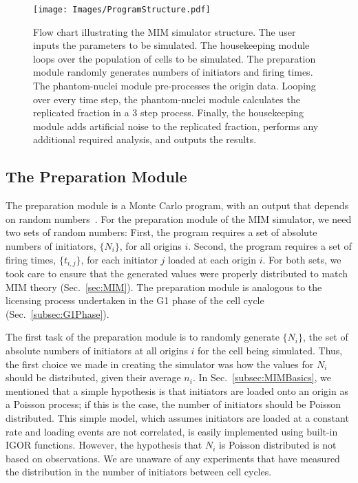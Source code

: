	\begin{figure}[1][tbh]
		\begin{center}
			\texttt{[image: Images/ProgramStructure.pdf]}
		\end{center}
			\caption[MIM Simulator Program Structure]{\label{fig:ProgramStructure} 
				Flow chart illustrating the MIM simulator structure.
				The user inputs the parameters to be simulated.
				The housekeeping module loops over the population of cells to be simulated.
				The preparation module randomly generates numbers of initiators and firing times.
				The phantom-nuclei module pre-processes the origin data.
				Looping over every time step, the phantom-nuclei module calculates the replicated fraction in a 3 step process.
				Finally, the housekeeping module adds artificial noise to the replicated fraction, performs any additional required analysis, and outputs the results.
			}
%
	\end{figure}
	
	
		\subsection{The Preparation Module}
		\label{subsec:PrepModule}
		
		The preparation module is a Monte Carlo program, with an output that depends on random numbers~\cite{CompPhys}.
		For the preparation module of the MIM simulator,  we need two sets of random numbers:
		First, the program requires a set of absolute numbers of initiators, $\{N_i\}$, for all origins $i$.
		Second, the program requires a set of firing times, $\{t_{i,j}\}$, for each initiator $j$ loaded at each origin $i$.
		For both sets, we took care to ensure that the generated values were properly distributed to match MIM theory (Sec.~\ref{sec:MIM}).
		The preparation module is analogous to the licensing process undertaken in the G1 phase of the cell cycle (Sec.~\ref{subsec:G1Phase}).
			
		The first task of the preparation module is to randomly generate $\{N_i\}$, the set of absolute numbers of initiators at all origins $i$ for the cell being simulated.
		Thus, the first choice we made in creating the simulator was how the values for $N_i$ should be distributed, given their average $n_i$.
		In Sec.~\ref{subsec:MIMBasics}, we mentioned that a simple hypothesis is that initiators are loaded onto an origin as a Poisson process; if this is the case, the number of initiators should be Poisson distributed.
		This simple model, which assumes initiators are loaded at a constant rate and loading events are not correlated, is easily implemented using built-in IGOR functions.
		However, the hypothesis that $N_i$ is Poisson distributed is not based on observations.
		We are unaware of any experiments that have measured the distribution in the number of initiators between cell cycles.
		
